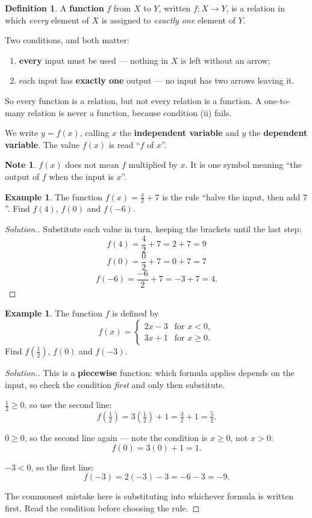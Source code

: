 \documentclass[11pt,a4paper]{article}
\theoremstyle{definition}
\newtheorem{definition}[thm]{Definition}
\newtheorem{example}[thm]{Example}
\newtheorem{note}[thm]{Note}
\newenvironment{solution}
  {\renewcommand{\qedsymbol}{}\begin{proof}[\textit{Solution}.]}
  {\end{proof}}
\begin{document}
\begin{definition}
A \textbf{function} $f$ from $X$ to $Y$, written $f:X\to Y$, is a relation in which
\emph{every} element of $X$ is assigned to \emph{exactly one} element of $Y$.
\end{definition}

Two conditions, and both matter:

\begin{enumerate}
\item[(i).] \textbf{every} input must be used --- nothing in $X$ is left without an
arrow;
\item[(ii).] each input has \textbf{exactly one} output --- no input has two arrows
leaving it.
\end{enumerate}

So every function is a relation, but not every relation is a function. A one-to-many
relation is never a function, because condition (ii) fails.

We write $y=f(x)$, calling $x$ the \textbf{independent variable} and $y$ the
\textbf{dependent variable}. The value $f(x)$ is read ``$f$ of $x$''.

\begin{note}
$f(x)$ does not mean $f$ multiplied by $x$. It is one symbol meaning ``the output of
$f$ when the input is $x$''.
\end{note}

\begin{example}
The function $f(x)=\frac{x}{2}+7$ is the rule ``halve the input, then add $7$''.
Find $f(4)$, $f(0)$ and $f(-6)$.
\end{example}

\begin{solution}
Substitute each value in turn, keeping the brackets until the last step:
$$f(4)=\frac{4}{2}+7=2+7=9$$
$$f(0)=\frac{0}{2}+7=0+7=7$$
$$f(-6)=\frac{-6}{2}+7=-3+7=4.$$
\end{solution}

\begin{example}
The function $f$ is defined by
$$f(x)=\begin{cases} 2x-3 & \text{for } x<0,\\ 3x+1 & \text{for } x\geq 0.\end{cases}$$
Find $f\!\left(\tfrac{1}{2}\right)$, $f(0)$ and $f(-3)$.
\end{example}

\begin{solution}
This is a \textbf{piecewise} function: which formula applies depends on the input, so
check the condition \emph{first} and only then substitute.

$\tfrac{1}{2}\geq 0$, so use the second line:
$$f\!\left(\tfrac{1}{2}\right)=3\!\left(\tfrac{1}{2}\right)+1=\tfrac{3}{2}+1=\tfrac{5}{2}.$$

$0\geq 0$, so the second line again --- note the condition is $x\geq 0$, not $x>0$:
$$f(0)=3(0)+1=1.$$

$-3<0$, so the first line:
$$f(-3)=2(-3)-3=-6-3=-9.$$

The commonest mistake here is substituting into whichever formula is written first.
Read the condition before choosing the rule.
\end{solution}
\end{document}
